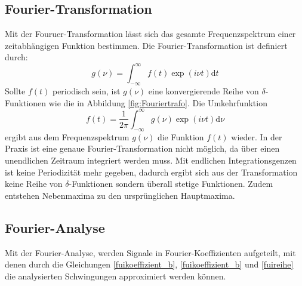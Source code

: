 \subsection{Fourier-Transformation}
\label{sec:Fourier-Transformation}
Mit der Fouruer-Transformation lässt sich das gesamte Frequenzspektrum einer
zeitabhängigen Funktion bestimmen. Die Fourier-Transformation ist definiert durch:
\begin{equation}
  g(\nu)= \int_{-\infty}^\infty f(t)\exp(i\nu t) \mathrm{d}t
\end{equation}
Sollte $f(t)$ periodisch sein, ist $g(\nu)$ eine konvergierende Reihe von
$\delta$-Funktionen wie die in Abbildung \ref{fig:Fouriertrafo}. Die Umkehrfunktion
\begin{equation}
  f(t)= \frac{1}{2\pi}\int_{-\infty}^\infty g(\nu)\exp(i\nu t) \mathrm{d}\nu
\end{equation}
ergibt aus dem Frequenzspektrum $g(\nu)$ die Funktion $f(t)$ wieder. In der
Praxis ist eine genaue Fourier-Transformation nicht möglich, da über einen unendlichen
Zeitraum integriert werden muss. Mit endlichen Integrationsgenzen ist keine
Periodizität mehr gegeben, dadurch ergibt sich aus der Transformation keine Reihe
von $\delta$-Funktionen sondern überall stetige Funktionen. Zudem entstehen
Nebenmaxima zu den ursprünglichen Hauptmaxima.
\subsection{Fourier-Analyse}
\label{sec:Fourier-Analyse}
Mit der Fourier-Analyse, werden Signale in Fourier-Koeffizienten aufgeteilt, mit
denen durch die Gleichungen \eqref{fuikoeffizient_b}, \eqref{fuikoeffizient_b}
und \eqref{fuireihe} die analysierten Schwingungen approximiert werden können.

\cite{sample}
